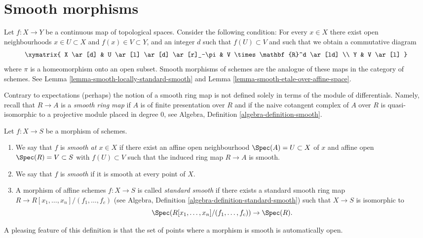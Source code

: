 \section{Smooth morphisms}
\label{section-smooth}

\noindent
Let $f : X \to Y$ be a continuous map of topological spaces.
Consider the following condition:
For every $x \in X$ there exist open neighbourhoods
$x \in U \subset X$ and $f(x) \in V \subset Y$, and an integer $d$
such that $f(U) \subset V$ and such that we obtain
a commutative diagram
$$
\xymatrix{
X \ar[d] &
U \ar[l] \ar[d] \ar[r]_-\pi &
V \times \mathbf{R}^d \ar[ld] \\
Y & V \ar[l]
}
$$
where $\pi$ is a homeomorphism onto an open subset.
Smooth morphisms of schemes are the analogue of these maps
in the category of schemes. See
Lemma \ref{lemma-smooth-locally-standard-smooth}
and
Lemma \ref{lemma-smooth-etale-over-affine-space}.

\medskip\noindent
Contrary to expectations (perhaps) the notion
of a smooth ring map is not defined solely in terms
of the module of differentials. Namely, recall that
$R \to A$ is a {\it smooth ring map} if $A$ is of finite presentation over $R$
and if the naive cotangent complex of $A$ over $R$ is quasi-isomorphic
to a projective module placed in degree $0$, see
Algebra, Definition \ref{algebra-definition-smooth}.

\begin{definition}
\label{definition-smooth}
Let $f : X \to S$ be a morphism of schemes.
\begin{enumerate}
\item We say that $f$ is {\it smooth at $x \in X$} if
there exist an affine open neighbourhood $\Spec(A) = U \subset X$
of $x$ and affine open $\Spec(R) = V \subset S$
with $f(U) \subset V$ such that the induced ring map
$R \to A$ is smooth.
\item We say that $f$ is {\it smooth} if it is smooth at every point of $X$.
\item A morphism of affine schemes $f : X \to S$
is called {\it standard smooth} if there exists a standard smooth ring
map $R \to R[x_1, \ldots, x_n]/(f_1, \ldots, f_c)$ (see
Algebra, Definition \ref{algebra-definition-standard-smooth})
such that $X \to S$ is isomorphic to
$$
\Spec(R[x_1, \ldots, x_n]/(f_1, \ldots, f_c)) \to \Spec(R).
$$
\end{enumerate}
\end{definition}

\noindent
A pleasing feature of this definition is that the set of points
where a morphism is smooth is automatically open.

